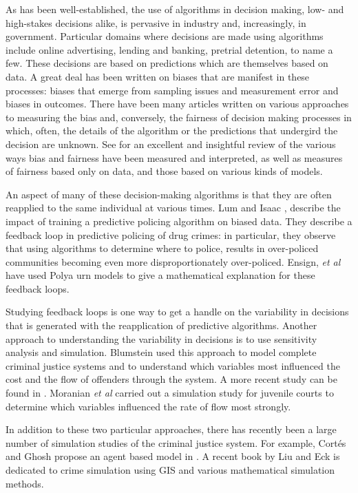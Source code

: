 \documentclass{amsproc}
\numberwithin{equation}{section}
\theoremstyle{plain}
\theoremstyle{remark}
\begin{document}
As has been well-established, the use of algorithms in decision making, low- and high-stakes decisions alike, is pervasive in industry and, increasingly, in government.  Particular domains where decisions are made using algorithms include online advertising, lending and banking, pretrial detention, to name a few.  These decisions are based on predictions which are themselves based on data.  A great deal has been written on biases that are manifest in these processes:  biases that emerge from sampling issues and measurement error and biases in outcomes.  There have been many articles written on various approaches to measuring the bias and, conversely, the fairness of decision making processes in which, often, the details of the algorithm or the predictions that undergird the decision are unknown.  See \cite{mitchell} for an excellent and insightful review of the various ways bias and fairness have been measured and interpreted, as well as measures of fairness based only on data, and those based on various kinds of models.  

An aspect of many of these decision-making algorithms is that they are often reapplied to the same individual at various times.  Lum and Isaac \cite{lum}, describe the impact of training a predictive policing algorithm on biased data.  They describe a feedback loop in predictive policing of drug crimes: in particular, they observe that using algorithms to determine where to police, results in over-policed communities becoming even more disproportionately over-policed. Ensign, \textit{et al} \cite{ensign} have used Polya urn models to give a mathematical explanation for these feedback loops.  

Studying feedback loops is one way to get a handle on the variability in decisions that is generated with the reapplication of predictive algorithms.  Another approach to understanding the variability in decisions is to use sensitivity analysis and simulation.  Blumstein \cite{blumstein} used this approach to model complete criminal justice systems  and to understand which variables most influenced the cost and the flow of offenders through the system.  A more recent study can be found in \cite{dabbaghian}.  Moranian \textit{et al} \cite{moranian} carried out a simulation study for juvenile courts to determine which variables influenced the rate of flow most strongly.  

In addition to these two particular approaches, there has recently been a large number of simulation studies of the criminal justice system.  For example, Cort\'{e}s and Ghosh propose an agent based model in \cite{cortes}. A recent book by Liu and Eck \cite{liu} is dedicated to crime simulation using GIS and various mathematical simulation methods.
\end{document}
